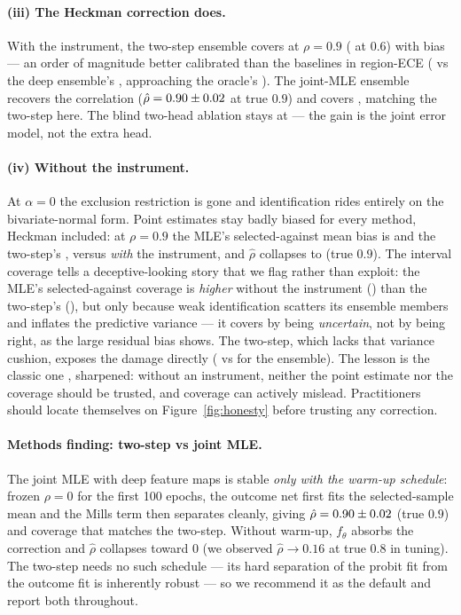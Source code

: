 \documentclass[10pt]{article}
\begin{document}
\paragraph{(iii) The Heckman correction does.} With the instrument, the
two-step ensemble covers \CovAgHeckTSHi{} at $\rho = 0.9$
(\CovAgHeckTSMid{} at $0.6$) with bias \BiasAgHeckTSHi{} --- an order of
magnitude better calibrated than the baselines in region-ECE
(\ECEAgHeckTSHi{} vs the deep ensemble's \ECEAgEnsHi{}, approaching the
oracle's \ECEAgOracleHi{}). The joint-MLE ensemble recovers the
correlation ($\hat\rho = 0.90 \pm 0.02$ at true $0.9$) and
covers \CovAgHeckHi{}, matching the two-step here. The blind two-head
ablation stays at \CovAgBlindHi{} --- the gain is the joint error model,
not the extra head.

\paragraph{(iv) Without the instrument.} At $\alpha = 0$ the exclusion
restriction is gone and identification rides entirely on the
bivariate-normal form. Point estimates stay badly biased for every method,
Heckman included: at $\rho = 0.9$ the MLE's selected-against mean bias is
\BiasAgHeckHiNoInstr{} and the two-step's \BiasAgHeckTSHiNoInstr{}, versus
\BiasAgHeckTSHi{} \emph{with} the instrument, and $\hat\rho$ collapses to
\RhoHatHiNoInstr{} (true $0.9$). The interval coverage tells a
deceptive-looking story that we flag rather than exploit: the MLE's
selected-against coverage is \emph{higher} without the instrument
(\CovAgHeckHiNoInstr{}) than the two-step's (\CovAgHeckTSHiNoInstr{}), but
only because weak identification scatters its ensemble members and inflates
the predictive variance --- it covers by being \emph{uncertain}, not by
being right, as the large residual bias shows. The two-step, which lacks
that variance cushion, exposes the damage directly
(\CovAgHeckTSHiNoInstr{} vs \CovAgEnsHiNoInstr{} for the ensemble). The
lesson is the classic one \citep{puhani2000}, sharpened: without an
instrument, neither the point estimate nor the coverage should be trusted,
and coverage can actively mislead. Practitioners should locate themselves
on Figure~\ref{fig:honesty} before trusting any correction.

\paragraph{Methods finding: two-step vs joint MLE.} The joint MLE with
deep feature maps is stable \emph{only with the warm-up schedule}: frozen
$\rho = 0$ for the first 100 epochs, the outcome net first fits the
selected-sample mean and the Mills term then separates cleanly, giving
$\hat\rho = 0.90 \pm 0.02$ (true $0.9$) and coverage
\CovAgHeckHi{} that matches the two-step. Without warm-up, $f_\theta$
absorbs the correction and $\hat\rho$ collapses toward $0$ (we observed
$\hat\rho \to 0.16$ at true $0.8$ in tuning). The two-step needs no such
schedule --- its hard separation of the probit fit from the outcome fit
is inherently robust --- so we recommend it as the default and report both
throughout.
\end{document}

